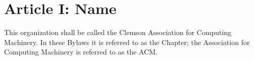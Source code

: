 \section*{Article I: Name}

This organization shall be called the Clemson Association for Computing Machinery.
In these Bylaws it is referred to as the Chapter; the Association for Computing Machinery is referred to as the ACM.
